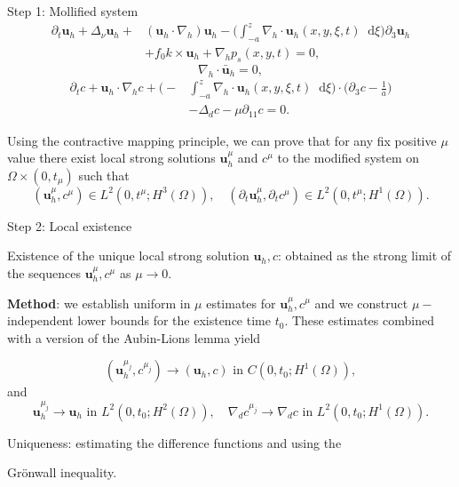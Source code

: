 \documentclass{beamer}
\newcommand*\diff{\mathop{}\!\mathrm{d}}
\begin{document}
\begin{frame}{Step 1: Mollified system}
\vspace{-0.5cm}
\begin{equation} \nonumber
\begin{split}
\partial_t \mathbf{u}_h + \Delta_\nu \mathbf{u}_h + & (\mathbf{u}_h \cdot \nabla_h) \mathbf{u}_h - \bigg ( \int_{-a}^z \nabla_h \cdot \mathbf{u}_h (x, y, \xi, t) \diff \xi \bigg ) \partial_3 \mathbf{u}_h \\
& + f_0 k \times \mathbf{u}_h + \nabla_h p_s (x,y,t) = 0,
\end{split}
\end{equation}
%
\begin{equation} \nonumber
\nabla_h \cdot \bar{\mathbf{u}}_h = 0,
\end{equation}
%
\begin{equation} \nonumber
\begin{split}
\partial_t c+ \mathbf{u}_h \cdot \nabla_h c + \bigg ( - & \int_{-a}^z \nabla_h \cdot \mathbf{u}_h (x, y, \xi, t) \diff \xi \bigg ) \cdot \bigg (\partial_3 c - \frac{1}{a} \bigg ) \\
& - \Delta_{d} c - \mu \partial_{11} c = 0.
\end{split}
\end{equation}

Using the contractive mapping principle, we can prove that for any fix positive $\mu$ value there exist local strong solutions $\mathbf{u}_h^\mu$ and $c^\mu$ to the modified system on $\Omega \times (0, t_\mu)$ such that
%
\[ (\mathbf{u}_h^\mu, c^\mu) \in L^2 (0, t^\mu; H^3(\Omega)), \quad (\partial_t \mathbf{u}_h^\mu, \partial_t c^\mu) \in L^2 (0, t^\mu; H^1 (\Omega)). \]

\end{frame}

\begin{frame}{Step 2: Local existence}

Existence of the unique local strong solution $\mathbf{u}_h, c$: obtained as the strong limit of the sequences $\mathbf{u}_h^\mu, c^\mu$ as $\mu \to 0$.

\textbf{Method}: we establish uniform in $\mu$ estimates for $\mathbf{u}_h^\mu, c^\mu$ and we construct $\mu-$ independent lower bounds for the existence time $t_0$. These estimates combined with a version of the Aubin-Lions lemma yield
  
\begin{equation} \nonumber
(\mathbf{u}_h^{\mu_j}, c^{\mu_j}) \to (\mathbf{u}_h, c) \text{ in } C(0, t_0; H^1(\Omega)),
\end{equation}
%
and
%
\begin{equation} \nonumber
\mathbf{u}_h^{\mu_j} \to \mathbf{u}_h \text{ in } L^2(0, t_0; H^2(\Omega)), \quad \nabla_d c^{\mu_j} \to \nabla_d c \text{ in } L^2(0, t_0; H^1(\Omega)).
\end{equation}
  
\hspace{0.3cm}Uniqueness: estimating the difference functions and using the

\hspace{0.3cm}Gr\"onwall inequality.

\end{frame}
\end{document}
